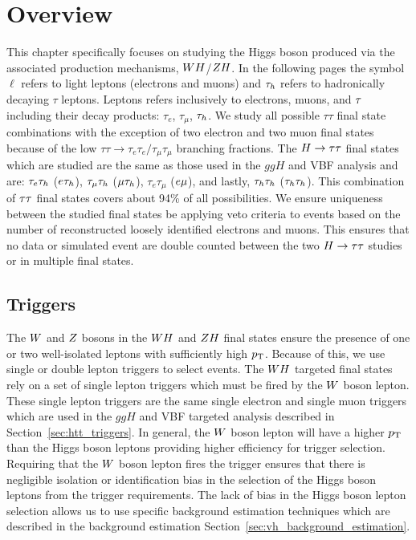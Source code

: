 \section{Overview}
This chapter specifically focuses on studying the Higgs boson produced via the associated
production mechanisms, $WH$/$ZH$.
In the following pages the symbol $\ell$ refers to light leptons (electrons and muons) and $\tau_{h}$ refers to hadronically
decaying $\tau$ leptons. Leptons refers inclusively to electrons, muons, and $\tau$ including their decay products:
$\tau_{e}$, $\tau_{\mu}$, $\tau_{h}$.
We study all possible $\tau\tau$ final state combinations with the
exception of two electron and two muon final states because of the low 
$\tau\tau \to \tau_{e}\tau_{e}/\tau_{\mu}\tau_{\mu}$
branching fractions. The $H\to\tau\tau$ final states which are
studied are the same as those used in the $ggH$ and VBF analysis and are: 
$\tau_{e}\tau_{h}$ ($e\tau_{h}$), $\tau_{\mu}\tau_{h}$ ($\mu\tau_{h}$),
$\tau_{e}\tau_{\mu}$ ($e\mu$), and lastly, $\tau_{h}\tau_{h}$ ($\tau_{h}\tau_{h}$).
This combination of $\tau\tau$ final states covers about 94\% of all possibilities.
We ensure uniqueness between the studied final states be applying veto criteria to events based
on the number of reconstructed loosely identified electrons and muons. This ensures that 
no data or simulated event are double counted between the two $H\to\tau\tau$ studies or in 
multiple final states.



\subsection{Triggers}
The $W$ and $Z$ bosons in the $WH$ and $ZH$ final states ensure the presence of one 
or two well-isolated leptons with sufficiently high $p_\mathrm{T}$. Because of this,
we use single or double lepton triggers to select events.
The $WH$ targeted final states rely on a set of single lepton triggers
which must be fired by the $W$ boson lepton. These single
lepton triggers are the same single electron and single muon triggers which are 
used in the $ggH$ and VBF targeted analysis described in 
Section~\ref{sec:htt_triggers}. In general, the $W$ boson lepton
will have a higher $p_\mathrm{T}$ than the Higgs boson leptons providing
higher efficiency for trigger selection. Requiring that the $W$
boson lepton fires the trigger ensures that there is negligible
isolation or identification
bias in the selection of the Higgs boson leptons from the trigger
requirements. The lack of bias in the Higgs boson lepton selection 
allows us to use specific background estimation techniques which are described
in the background estimation Section~\ref{sec:vh_background_estimation}.

